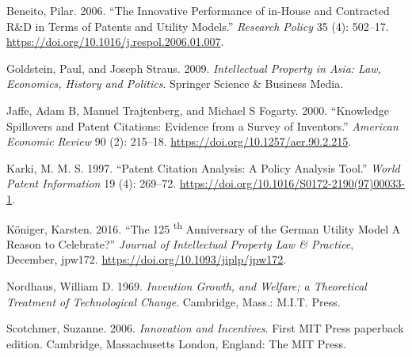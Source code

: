 \documentclass[
  12pt,
]{article}
\begin{document}
\leavevmode\hypertarget{ref-beneitoInnovativePerformanceInhouse2006}{}%
Beneito, Pilar. 2006. ``The Innovative Performance of in-House and
Contracted R\&D in Terms of Patents and Utility Models.'' \emph{Research
Policy} 35 (4): 502--17.
\url{https://doi.org/10.1016/j.respol.2006.01.007}.

\leavevmode\hypertarget{ref-goldsteinIntellectualPropertyAsia2009}{}%
Goldstein, Paul, and Joseph Straus. 2009. \emph{Intellectual Property in
Asia: Law, Economics, History and Politics}. Springer Science \&
Business Media.

\leavevmode\hypertarget{ref-jaffeKnowledgeSpilloversPatent2000}{}%
Jaffe, Adam B, Manuel Trajtenberg, and Michael S Fogarty. 2000.
``Knowledge Spillovers and Patent Citations: Evidence from a Survey of
Inventors.'' \emph{American Economic Review} 90 (2): 215--18.
\url{https://doi.org/10.1257/aer.90.2.215}.

\leavevmode\hypertarget{ref-karkiPatentCitationAnalysis1997}{}%
Karki, M. M. S. 1997. ``Patent Citation Analysis: A Policy Analysis
Tool.'' \emph{World Patent Information} 19 (4): 269--72.
\url{https://doi.org/10.1016/S0172-2190(97)00033-1}.

\leavevmode\hypertarget{ref-koniger125ThAnniversary2016}{}%
Königer, Karsten. 2016. ``The 125 \textsuperscript{th} Anniversary of
the German Utility Model A Reason to Celebrate?'' \emph{Journal of
Intellectual Property Law \& Practice}, December, jpw172.
\url{https://doi.org/10.1093/jiplp/jpw172}.

\leavevmode\hypertarget{ref-nordhausInventionGrowthWelfare1969}{}%
Nordhaus, William D. 1969. \emph{Invention Growth, and Welfare; a
Theoretical Treatment of Technological Change}. Cambridge, Mass.: M.I.T.
Press.

\leavevmode\hypertarget{ref-scotchmerInnovationIncentives2006}{}%
Scotchmer, Suzanne. 2006. \emph{Innovation and Incentives}. First MIT
Press paperback edition. Cambridge, Massachusetts London, England: The
MIT Press.
\end{document}
